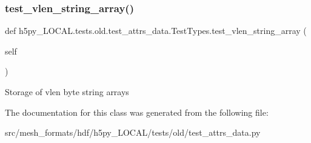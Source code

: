 \subsubsection{\texorpdfstring{test\+\_\+vlen\+\_\+string\+\_\+array()}{test\_vlen\_string\_array()}}
{\footnotesize\ttfamily def h5py\+\_\+\+L\+O\+C\+A\+L.\+tests.\+old.\+test\+\_\+attrs\+\_\+data.\+Test\+Types.\+test\+\_\+vlen\+\_\+string\+\_\+array (\begin{DoxyParamCaption}\item[{}]{self }\end{DoxyParamCaption})}

\begin{DoxyVerb}Storage of vlen byte string arrays\end{DoxyVerb}
 

The documentation for this class was generated from the following file\+:\begin{DoxyCompactItemize}
\item 
src/mesh\+\_\+formats/hdf/h5py\+\_\+\+L\+O\+C\+A\+L/tests/old/test\+\_\+attrs\+\_\+data.\+py\end{DoxyCompactItemize}
